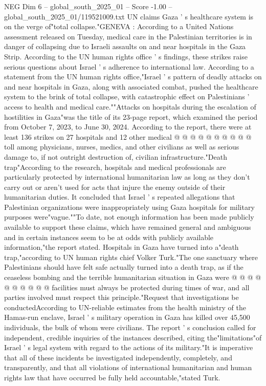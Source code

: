 \begin{textsample}{NEG Dim 6 – global\_south\_2025\_01 – Score -1.00 – global\_south\_2025\_01/119521009.txt}  \label{ex:f6_neg_004}
UN claims Gaza ' s healthcare system is on the verge of"total collapse."GENEVA : According to a United Nations assessment released on Tuesday, medical care in the Palestinian territories is in danger of collapsing due to Israeli assaults on and near hospitals in the Gaza Strip.
According to the UN human rights office ' s findings, these strikes raise serious questions about Israel ' s adherence to international law.
According to a statement from the UN human rights office,"Israel ' s pattern of deadly attacks on and near hospitals in Gaza, along with associated combat, pushed the healthcare system to the brink of total collapse, with catastrophic effect on Palestinians ' access to health and medical care.""Attacks on hospitals during the escalation of hostilities in Gaza"was the title of its 23-page report, which examined the period from October 7, 2023, to June 30, 2024.
According to the report, there were at least 136 strikes on 27 hospitals and 12 other medical @ @ @ @ @ @ @ @ @ @ toll among physicians, nurses, medics, and other civilians as well as serious damage to, if not outright destruction of, civilian infrastructure."Death trap"According to the research, hospitals and medical professionals are particularly protected by international humanitarian law as long as they don't carry out or aren't used for acts that injure the enemy outside of their humanitarian duties.
It concluded that Israel ' s repeated allegations that Palestinian organizations were inappropriately using Gaza hospitals for military purposes were"vague.""To date, not enough information has been made publicly available to support these claims, which have remained general and ambiguous and in certain instances seem to be at odds with publicly available information,"the report stated.
Hospitals in Gaza have turned into a"death trap,"according to UN human rights chief Volker Turk."The one sanctuary where Palestinians should have felt safe actually turned into a death trap, as if the ceaseless bombing and the terrible humanitarian situation in Gaza were @ @ @ @ @ @ @ @ @ @ facilities must always be protected during times of war, and all parties involved must respect this principle."Request that investigations be conductedAccording to UN-reliable estimates from the health ministry of the Hamas-run enclave, Israel ' s military operation in Gaza has killed over 45,500 individuals, the bulk of whom were civilians.
The report ' s conclusion called for independent, credible inquiries of the instances described, citing the"limitations"of Israel ' s legal system with regard to the actions of its military."It is imperative that all of these incidents be investigated independently, completely, and transparently, and that all violations of international humanitarian and human rights law that have occurred be fully held accountable,"stated Turk.

\end{textsample}
